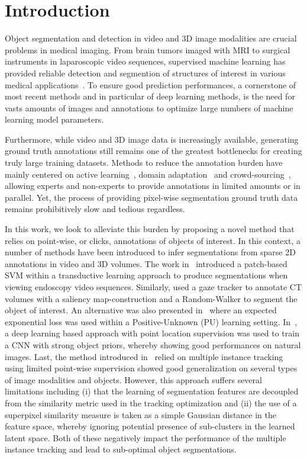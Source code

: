 \section{Introduction}
\label{sec:intro}

Object segmentation and detection in video and 3D image modalities are crucial problems in medical imaging.
From brain tumors imaged with MRI to surgical instruments in laparoscopic video sequences, supervised machine learning has provided reliable detection and segmention of structures of interest in various medical applications~\cite{menze15,sznitman2014,zikic2014}.
To ensure good prediction performances, a cornerstone of most recent methods and in particular of deep learning methods, is the need for vasts amounts of images and annotations to optimize large numbers of machine learning model parameters. 

Furthermore, while video and 3D image data is increasingly available, generating
ground truth annotations still remains one of the greatest bottlenecks
for creating truly large training datasets. Methods to reduce the annotation
burden have mainly centered on active learning~\cite{KonSznFua15,MosSzn16},
domain adaptation~\cite{ShiRoth16,BerBecSalFua2016} and
crowd-sourcing~\cite{Cheplygina2016}, allowing experts and
non-experts to provide annotations in limited amounts or in parallel. Yet, the
process of providing pixel-wise segmentation ground truth data remains prohibitively slow and tedious regardless. 

In this work, we look to alleviate this burden by proposing a novel method that relies on point-wise, or clicks, annotations of objects of interest.
In this context, a number of methods have been introduced to infer segmentations from sparse 2D annotations in video and 3D volumes.
The work in~\cite{vilarino2007} introduced a patch-based SVM within a transductive learning approach to produce segmentations when viewing endoscopy video sequences.
Similarly, \cite{khosravan16} used a gaze tracker to annotate CT volumes with a saliency map-construction and a Random-Walker to segment the object of interest.
An alternative was also presented in~\cite{lejeune17} where an expected exponential loss was used within a Positive-Unknown (PU) learning setting.
In~\cite{bearman16}, a deep learning based approach with point location supervision was used to train a CNN with strong object priors, whereby showing good performances on natural images.
Last, the method introduced in~\cite{lejeune18} relied on multiple instance tracking using limited point-wise supervision showed good generalization on several types of image modalities and objects.
However, this approach suffers several limitations including (i) that the learning of segmentation features are decoupled from the similarity metric used in the tracking optimization and (ii) the use of a superpixel similarity measure is taken as a simple Gaussian distance in the feature space, whereby ignoring potential presence of sub-clusters in the learned latent space.
Both of these negatively impact the performance of the multiple instance tracking and lead to sub-optimal object segmentations. 

